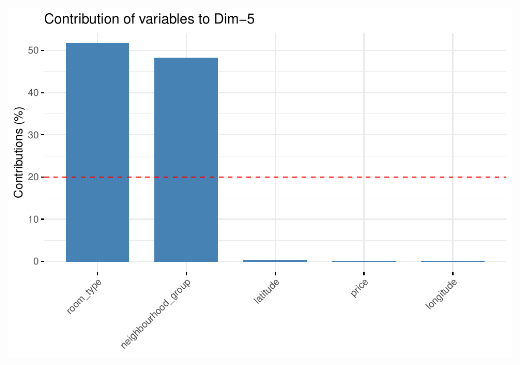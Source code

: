 \documentclass[
]{article}
\begin{document}
\includegraphics{project-code_files/figure-latex/unnamed-chunk-38-6.pdf}
\end{document}
